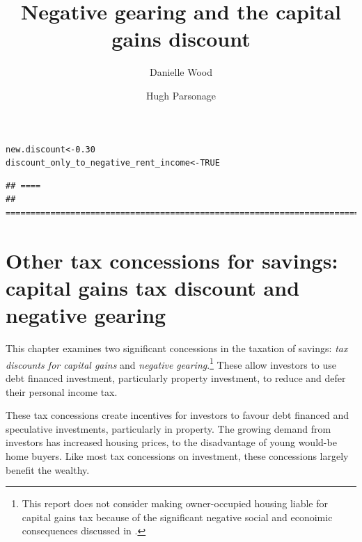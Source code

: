 \documentclass{grattan}\usepackage[]{graphicx}\usepackage[]{color}
\title{Negative gearing and the capital gains discount}
\author{Danielle Wood \and Hugh Parsonage}
\makeatletter
\newcommand{\hlnum}[1]{\textcolor[rgb]{0.686,0.059,0.569}{#1}}%
\newcommand{\hlstd}[1]{\textcolor[rgb]{0.345,0.345,0.345}{#1}}%
\newcommand{\hlkwb}[1]{\textcolor[rgb]{0.69,0.353,0.396}{#1}}%
\newenvironment{kframe}{%
 \def\at@end@of@kframe{}%
 \ifinner\ifhmode%
  \def\at@end@of@kframe{\end{minipage}}%
  \begin{minipage}{\columnwidth}%
 \fi\fi%
 \def\FrameCommand##1{\hskip\@totalleftmargin \hskip-\fboxsep
 \colorbox{shadecolor}{##1}\hskip-\fboxsep
     \hskip-\linewidth \hskip-\@totalleftmargin \hskip\columnwidth}%
 \MakeFramed {\advance\hsize-\width
   \@totalleftmargin\z@ \linewidth\hsize
   \@setminipage}}%
 {\par\unskip\endMakeFramed%
 \at@end@of@kframe}
\newenvironment{knitrout}{}{} %
\newcommand{\highlight}[1]{\emph{#1}}
\makeatother
\begin{document}
\clearpage


\raggedbottom
\contentspage
\listoffigures
\listoftables



\begin{knitrout}
\color{fgcolor}\begin{kframe}
\begin{alltt}
\hlstd{new.discount} \hlkwb{<-} \hlnum{0.30}
\hlstd{discount_only_to_negative_rent_income} \hlkwb{<-} \hlnum{TRUE}
\end{alltt}
\end{kframe}
\end{knitrout}






\begin{knitrout}
\color{fgcolor}\begin{kframe}
\begin{verbatim}
## ====
## =======================================================================
\end{verbatim}
\end{kframe}
\end{knitrout}

\chapter{Other tax concessions for savings: capital gains tax discount and negative gearing}
This chapter examines two significant concessions in the taxation of savings: \highlight{tax discounts for capital gains} and \highlight{negative gearing}.\footnote{This report does not consider making owner-occupied housing liable for capital gains tax because of the significant negative social and econoimic consequences discussed in \textcite[pp.~43-45]{Daley2013}.}  These allow investors to use debt financed investment, particularly property investment, to reduce and defer their personal income tax.

These tax concessions create incentives for investors to favour debt financed and speculative investments, particularly in property. The growing demand from investors has increased housing prices, to the disadvantage of young would-be home buyers. Like most tax concessions on investment, these concessions largely benefit the wealthy. 
\end{document}
